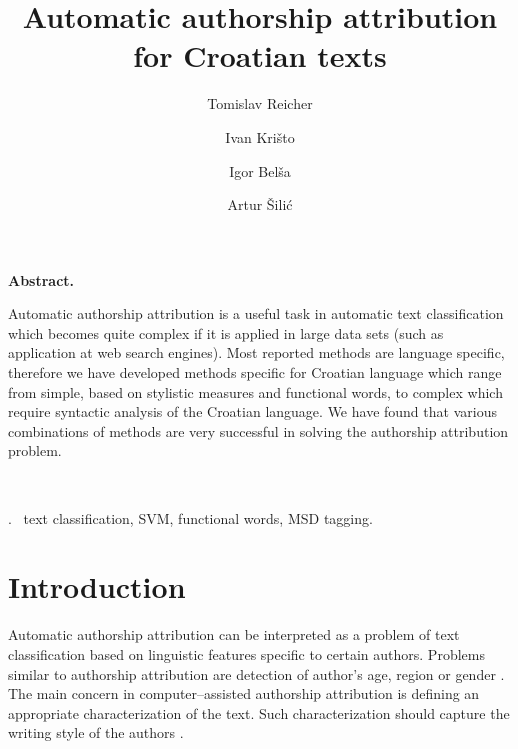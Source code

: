 \documentclass[11pt,english]{article}
\let\LaTeXtitle\title
\renewcommand{\title}[1]{\LaTeXtitle{\Large \textbf{#1}}}
\renewenvironment{abstract}
{\noindent \large \bf Abstract. \normalsize \begin{it}}
{\end{it}\\}
\newenvironment{keywords}
{\noindent {\large {\bf Keywords}}.~}{}
\begin{document}
\title{Automatic authorship attribution for Croatian texts}
\author{Tomislav Reicher}
\author{Ivan Krišto}
\author{Igor Belša}
\author{Artur Šilić}

\date{}

\maketitle

\thispagestyle{empty}
\pagestyle{empty}
\begin{multicols}{2}


\begin{abstract}
Automatic authorship attribution is a useful task in automatic text
classification which becomes quite complex if it is applied in large data sets
(such as application at web search engines). Most reported methods are language
specific, therefore we have developed methods specific for Croatian language
which range from simple, based on stylistic measures and functional words, to
complex which require syntactic analysis of the Croatian language. We have found
that various combinations of methods are very successful in solving the
authorship attribution problem.
\end{abstract}

\begin{keywords}
text classification, SVM, functional words, MSD tagging.
\end{keywords}

\section{Introduction}
Automatic authorship attribution can be interpreted as a problem of text
classification based on linguistic features specific to certain authors. Problems similar to authorship
attribution are detection of author's age, region or gender
\citep{luyckx2005shallow}. The main concern in computer--assisted authorship
attribution is defining an appropriate characterization of the text. Such characterization should
capture the writing style of the authors \citep{coyotl2006authorship}.



\end{multicols}
\end{document}
